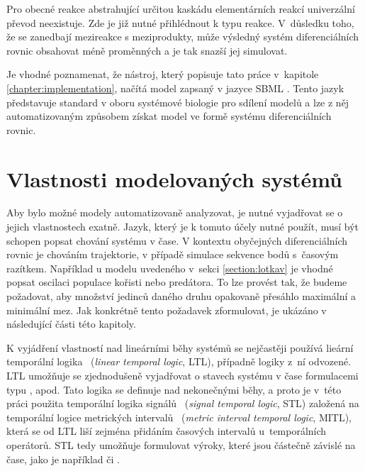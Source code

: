 Pro obecné reakce abstrahující určitou kaskádu elementárních reak\-cí univerzální
převod neexistuje. Zde je již nutné přihlédnout k typu reakce. V~dů\-sled\-ku toho, že se
zanedbají mezireakce s meziprodukty, může vý\-sled\-ný systém diferenciálních rovnic obsahovat
méně proměnných a je tak snazší jej simulovat.

Je vhodné poznamenat, že nástroj, který popisuje tato práce v~kapitole \ref{chapter:implementation},
načítá model zapsaný v jazyce SBML \cite{hucka2003,drager2011}. Tento jazyk představuje standard
v oboru systémové biologie pro sdílení modelů a lze z něj automatizovaným způsobem získat model
ve formě systému diferenciálních rovnic.

\section{Vlastnosti modelovaných systémů}

Aby bylo možné modely automatizovaně analyzovat, je nutné vyjadřovat se o jejich
vlastnostech exatně. Jazyk, který je k tomuto účely nutné použít, musí být schopen 
popsat chování systému v čase. V kontextu obyčejných di\-fe\-ren\-ci\-ál\-ních rovnic je
chováním trajektorie, v případě simulace sekvence bodů s~časovým razítkem. Například u modelu
uvedeného v~sekci \ref{section:lotkav} je vhodné popsat oscilaci populace kořisti
nebo predátora. To lze provést tak, že budeme požadovat, aby množství jedinců
daného druhu opakovaně pře\-sáh\-lo maximální a minimální mez. Jak konkrétně
tento po\-ža\-da\-vek zformulovat, je ukázáno v následující části této kapitoly.

K vyjádření vlastností nad lineárními běhy systémů se nejčastěji používá lieární
temporální logika~\cite{strejcek2007} (\textit{linear temporal logic}, LTL), případně logiky z~ní odvozené.
LTL u\-mož\-ňu\-je se zjednodušeně vyjadřovat o sta\-vech
sys\-té\-mu v čase formulacemi typu ,  apod.
Tato logika se definuje nad nekonečnými běhy, a proto je v~této práci použita temporální logika
signálů~\cite{maler2004} (\textit{signal temporal logic}, STL) založená na temporální logice metrických intervalů~\cite{alur1996} (\textit{metric interval temporal logic}, MITL),
která se od LTL liší zejména přidáním ča\-so\-vých intervalů u~temporálních operátorů. STL tedy
u\-mož\-ňu\-je formulovat výroky, které jsou čás\-teč\-ně zá\-vis\-lé na čase, jako
je například  či .

